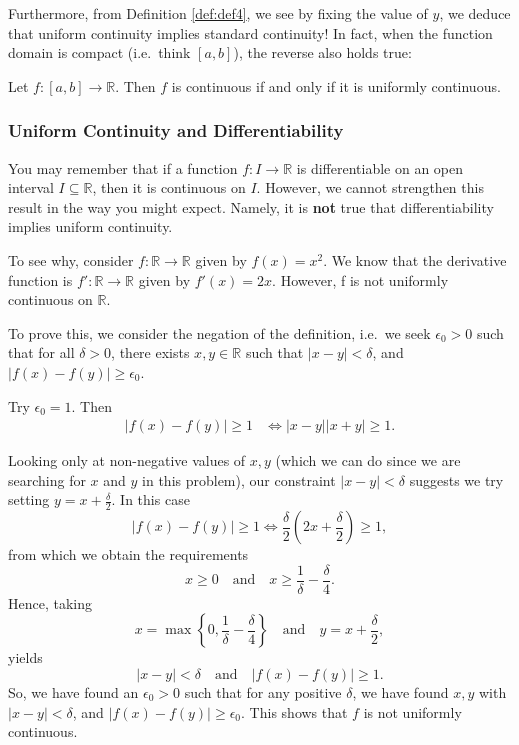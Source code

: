 \documentclass[
  12pt,
  a4paper]{extarticle}
\theoremstyle{plain}
\theoremstyle{definition}
\theoremstyle{plain}
\theoremstyle{plain}
\theoremstyle{plain}
\theoremstyle{plain}
\theoremstyle{definition}
\theoremstyle{definition}
\theoremstyle{remark}
\theoremstyle{remark}
\let\BeginKnitrBlock\begin \let\EndKnitrBlock\end
\renewcommand{\;}{\,}
\begin{document}
Furthermore, from Definition \ref{def:def4}, we see by fixing the value of \(y\), we deduce that uniform continuity implies standard continuity! In fact, when the function domain is compact (i.e.~think \([a,b]\)), the reverse also holds true:

\BeginKnitrBlock{proposition}
{\label{prp:prop2} }Let \(f:[a,b] \to \mathbb{R}\). Then \(f\) is continuous if and only if it is uniformly continuous.
\EndKnitrBlock{proposition}

\hypertarget{uniform-continuity-and-differentiability}{%
\subsubsection{Uniform Continuity and Differentiability}\label{uniform-continuity-and-differentiability}}

You may remember that if a function \(f:I \to \mathbb{R}\) is differentiable on an open interval \(I \subseteq \mathbb{R}\), then it is continuous on \(I\). However, we cannot strengthen this result in the way you might expect. Namely, it is \textbf{not} true that differentiability implies uniform continuity.

\BeginKnitrBlock{example}
{\label{exm:ex1} }To see why, consider \(f:\mathbb{R} \to \mathbb{R}\) given by \(f(x) = x^2\). We know that the derivative function is \(f':\mathbb{R} \to \mathbb{R}\) given by \(f'(x) = 2x.\) However, f is not uniformly continuous on \(\mathbb{R}\).

To prove this, we consider the negation of the definition, i.e.~we seek \(\epsilon_0 >0\) such that for all \(\delta > 0\), there exists \(x,y \in \mathbb{R}\) such that \(\lvert x - y \rvert < \delta\), and \(\lvert f(x) - f(y) \rvert \geq \epsilon_0.\)

Try \(\epsilon_0 = 1.\) Then
\begin{align*}
\lvert f(x) - f(y) \rvert \geq 1 &\Leftrightarrow \lvert x - y \rvert \lvert x + y \rvert \geq 1.
\end{align*}

Looking only at non-negative values of \(x,y\) (which we can do since we are searching for \(x\) and \(y\) in this problem), our constraint \(\lvert x - y \rvert < \delta\) suggests we try setting \(y = x + \frac{\delta}{2}.\) In this case \[\lvert f(x) - f(y) \rvert \geq 1 \Leftrightarrow \frac{\delta}{2}\left(2x + \frac{\delta}{2}\right) \geq 1,\] from which we obtain the requirements \[x \geq 0 \quad \text{and} \quad x \geq \frac{1}{\delta} - \frac{\delta}{4}.\] Hence, taking \[x = \max\left\lbrace 0 , \frac{1}{\delta} - \frac{\delta}{4}\right\rbrace \quad \text{and} \quad y = x + \frac{\delta}{2},\] yields \[\lvert x - y \rvert < \delta \quad \text{and} \quad \lvert f(x) - f(y) \rvert \geq 1.\] So, we have found an \(\epsilon_0>0\) such that for any positive \(\delta\), we have found \(x,y\) with \(\lvert x - y \rvert < \delta\), and \(\lvert f(x) - f(y) \rvert \geq \epsilon_0.\) This shows that \(f\) is not uniformly continuous.
\EndKnitrBlock{example}
\end{document}
